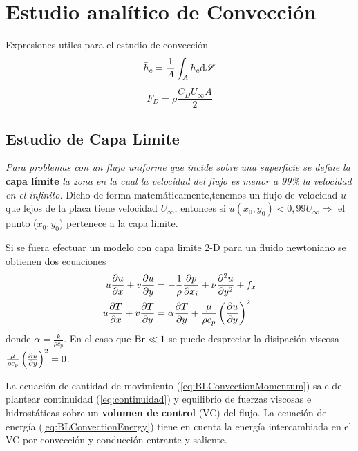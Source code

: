  

\section{Estudio analítico de Convección}
Expresiones utiles para el estudio de convección
\begin{equation}
    \bar{h}_c=\frac{1}{A}\int_A h_{c} \textrm{d} \mathscr{S}
\end{equation}
\begin{equation}
    F_D=\rho \frac{\overline{C}_D U_\infty A}{2}
\end{equation}
\subsection{Estudio de Capa Limite}
\emph{Para problemas con un flujo uniforme que incide sobre una superficie se define la} \textbf{capa límite} \emph{la zona en la cual la velocidad del flujo es menor a 99\% la velocidad en el infinito.} Dicho de forma matemáticamente,tenemos un flujo de velocidad $u$ que lejos de la placa tiene velocidad $U_\infty$, entonces si $u(x_0,y_0)<0,99U_\infty \Rightarrow$ el punto ($x_0,y_0$) pertenece a la capa limite.

Si se fuera efectuar un modelo con capa limite 2-D para un fluido newtoniano se obtienen dos ecuaciones
\begin{align} \label{eq:BLConvectionMomentum}
    u\frac{\partial  u}{\partial x}+v\frac{\partial u}{\partial y}&=-\frac{1}{\rho}\frac{\partial p}{\partial x_i}+\nu \frac{\partial^2 u}{\partial y ^2}+f_x\\ \label{eq:BLConvectionEnergy}
    u\frac{\partial T}{\partial x}+v\frac{\partial T}{\partial y}&=\alpha \frac{\partial T}{\partial y}+\frac{\mu}{\rho c_p}\left( \frac{\partial u}{\partial y}\right)^2
\end{align}
donde $\alpha=\frac{k}{\rho c_p}$. En el caso que $\textrm{Br}\ll1$ se puede despreciar la disipación viscosa $\frac{\mu}{\rho c_p}\left( \frac{\partial u}{\partial y}\right)^2=0 $. 

La ecuación de cantidad de movimiento (\ref{eq:BLConvectionMomentum}) sale de plantear continuidad (\ref{eq:continuidad}) y equilibrio de fuerzas viscosas e hidrostáticas sobre un \textbf{volumen de control} (VC) del flujo. La ecuación de energía (\ref{eq:BLConvectionEnergy}) tiene en cuenta la energía intercambiada en el VC por convección y conducción entrante y saliente.

